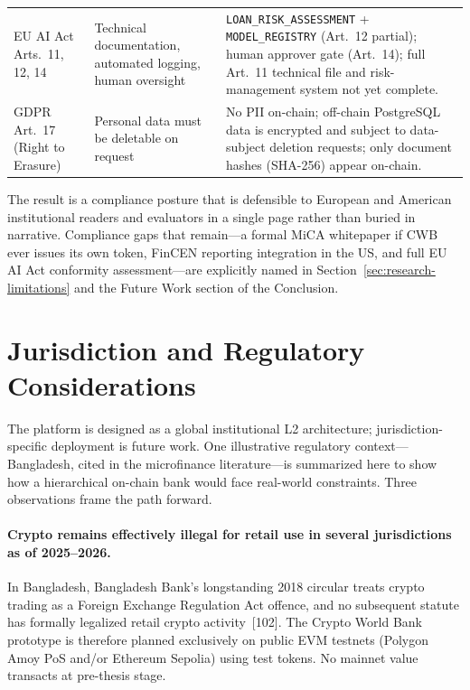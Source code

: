 \documentclass[12pt,a4paper]{report}
\begin{document}
\begin{table}[H]
\begin{tabular}{p{3.2cm}p{4.6cm}p{5.8cm}}
EU AI Act Arts.~11, 12, 14 & Technical documentation, automated logging, human oversight & \texttt{LOAN\_RISK\_ASSESSMENT} + \texttt{MODEL\_REGISTRY} (Art.~12 partial); human approver gate (Art.~14); full Art.~11 technical file and risk-management system not yet complete. \\
GDPR Art.~17 (Right to Erasure) & Personal data must be deletable on request & No PII on-chain; off-chain PostgreSQL data is encrypted and subject to data-subject deletion requests; only document hashes (SHA-256) appear on-chain. \\
\bottomrule
\end{tabular}
\end{table}

The result is a compliance posture that is defensible to European and American institutional readers and evaluators in a single page rather than buried in narrative. Compliance gaps that remain---a formal MiCA whitepaper if CWB ever issues its own token, FinCEN reporting integration in the US, and full EU AI Act conformity assessment---are explicitly named in Section~\ref{sec:research-limitations} and the Future Work section of the Conclusion.

\section{Jurisdiction and Regulatory Considerations}
\label{sec:bangladesh-reg}

The platform is designed as a global institutional L2 architecture; jurisdiction-specific deployment is future work. One illustrative regulatory context---Bangladesh, cited in the microfinance literature---is summarized here to show how a hierarchical on-chain bank would face real-world constraints. Three observations frame the path forward.

\paragraph{Crypto remains effectively illegal for retail use in several jurisdictions as of 2025--2026.}
In Bangladesh, Bangladesh Bank's longstanding 2018 circular treats crypto trading as a Foreign Exchange Regulation Act offence, and no subsequent statute has formally legalized retail crypto activity~[102]. The Crypto World Bank prototype is therefore planned exclusively on public EVM testnets (Polygon Amoy PoS and/or Ethereum Sepolia) using test tokens. No mainnet value transacts at pre-thesis stage.
\end{document}
